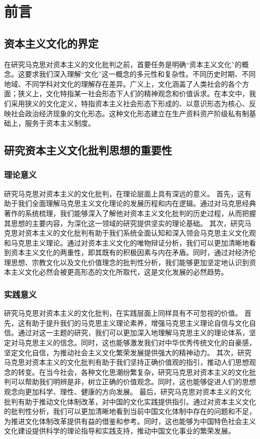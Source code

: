 \section{前言}
\subsection{资本主义文化的界定}
在研究马克思对资本主义的文化批判之前，首要任务是明确“资本主义文化”的概念。这要求我们深入理解“文化”这一概念的多元性和复杂性。不同历史时期、不同地域、不同学科对文化的理解存在差异。广义上，文化涵盖了人类社会的各个方面；狭义上，文化特指某一社会形态下人们的精神观念和价值诉求。在本文中，我们采用狭义的文化定义，特指资本主义社会形态下形成的、以意识形态为核心、反映社会政治经济现象的文化形态。这种文化形态建立在生产资料资产阶级私有制基础上，服务于资本主义制度。
\subsection{研究资本主义文化批判思想的重要性}
\subsubsection{理论意义}
研究马克思对资本主义的文化批判，在理论层面上具有深远的意义。
首先，这有助于我们全面理解马克思主义文化理论的发展历程和内在逻辑。通过对马克思经典著作的系统梳理，我们能够深入了解他对资本主义文化批判的历史过程，从而把握其思想的主要内容，为深化这一领域的研究提供坚实的理论基础。
其次，研究马克思对资本主义的文化批判有助于我们系统全面认知和深入领会马克思主义文化观和马克思主义理论。通过对资本主义文化的唯物辩证分析，我们可以更加清晰地看到资本主义文化的两重性，即其既有的积极因素与内在矛盾。同时，通过对经济伦理思想、宗教文化以及文化价值理念的批判性分析，我们能够更加坚定地认识到资本主义文化必然会被更高形态的文化所取代，这是文化发展的必然趋势。
\subsubsection{实践意义}
研究马克思对资本主义的文化批判，在实践层面上同样具有不可忽视的价值。
首先，这有助于提升我们的马克思主义理论素养，增强马克思主义理论自信与文化自信。通过对这一主题的研究，我们可以更加深入地理解马克思主义的理论体系，坚定对马克思主义的信念。同时，这也能够激发我们对中华优秀传统文化的自豪感，坚定文化自信，为推动社会主义文化繁荣发展提供强大的精神动力。
其次，研究马克思对资本主义的文化批判有助于我们坚持正确价值观的指引，推动人们思想观念的转变。在当今社会，各种文化思潮纷繁复杂，研究马克思对资本主义的文化批判可以帮助我们明辨是非，树立正确的价值观念。同时，这也能够促进人们的思想观念向更加科学、理性、健康的方向发展。
最后，研究马克思对资本主义的文化批判有助于推动文化体制改革，对中国的文化实践提供指引。通过对资本主义文化的批判性分析，我们可以更加清晰地看到当前中国文化体制中存在的问题和不足，为推进文化体制改革提供有益的借鉴和参考。同时，这也能够为中国特色社会主义文化建设提供科学的理论指导和实践支持，推动中国文化事业的繁荣发展。
